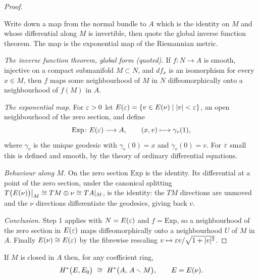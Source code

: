 \begin{proof}
\begin{strategy}
Write down a map from the normal bundle to $A$ which is the identity on $M$ and
whose differential along $M$ is invertible, then quote the global inverse
function theorem. The map is the exponential map of the Riemannian metric.
\end{strategy}

 \emph{The inverse function theorem, global form (quoted).} If
$f\colon N\to A$ is smooth, injective on a compact submanifold $M\subset N$, and
$df_x$ is an isomorphism for every $x\in M$, then $f$ maps some neighbourhood of
$M$ in $N$ diffeomorphically onto a neighbourhood of $f(M)$ in $A$.

 \emph{The exponential map.} For $\varepsilon>0$ let
$E(\varepsilon)=\{v\in E(\nu)\mid |v|<\varepsilon\}$, an open neighbourhood of the zero
section, and define
\[
\mathrm{Exp}\colon E(\varepsilon)\longrightarrow A,
\qquad
(x,v)\longmapsto\gamma_v(1),
\]
where $\gamma_v$ is the unique geodesic with $\gamma_v(0)=x$ and
$\dot\gamma_v(0)=v$. For $\varepsilon$ small this is defined and smooth, by the theory
of ordinary differential equations.

 \emph{Behaviour along $M$.} On the zero section $\mathrm{Exp}$ is the
identity. Its differential at a point of the zero section, under the canonical
splitting $T\big(E(\nu)\big)\big|_M\cong TM\oplus\nu\cong TA|_M$, is the identity:
the $TM$ directions are unmoved and the $\nu$ directions differentiate the
geodesics, giving back $v$.

 \emph{Conclusion.} Step 1 applies with $N=E(\varepsilon)$ and $f=\mathrm{Exp}$,
so a neighbourhood of the zero section in $E(\varepsilon)$ maps diffeomorphically onto
a neighbourhood $U$ of $M$ in $A$. Finally $E(\nu)\cong E(\varepsilon)$ by the fibrewise
rescaling $v\mapsto \varepsilon v/\sqrt{1+|v|^2}$.
\end{proof}

\begin{center}
\end{center}

\begin{corollary}\label{cor:excision-tube}
If $M$ is closed in $A$ then, for any coefficient ring,
\[
H^*\big(E,E_0\big)\ \iso\ H^*\big(A,\,A\smallsetminus M\big),
\qquad E=E(\nu).
\]
\end{corollary}


